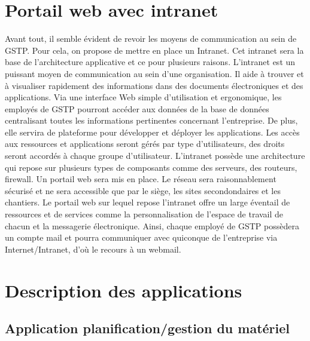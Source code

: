 \section{Portail web avec intranet}
	Avant tout, il semble évident de revoir les moyens de communication au sein de GSTP. Pour cela, on propose de mettre en place un Intranet. Cet intranet sera la base de l'architecture applicative et ce pour plusieurs raisons. L'intranet est un puissant moyen de communication au sein d'une organisation. Il aide à trouver et à visualiser rapidement des informations dans des documents électroniques et des applications. Via une interface Web simple d'utilisation et ergonomique, les employés de GSTP pourront accéder aux données de la base de données centralisant toutes les informations pertinentes concernant l'entreprise. De plus, elle servira de plateforme pour développer et déployer les applications. Les accès aux ressources et applications seront gérés par type d'utilisateurs, des droits seront accordés à chaque groupe d'utilisateur. L'intranet possède une architecture qui repose sur plusieurs types de composants comme des serveurs, des routeurs, firewall.
	Un portail web sera mis en place. Le réseau sera raisonnablement sécurisé et ne sera accessible que par le siège, les sites secondondaires et les chantiers. Le portail web sur lequel repose l'intranet offre un large éventail de ressources et de services comme la personnalisation de l'espace de travail de chacun et la messagerie électronique. Ainsi, chaque employé de GSTP possèdera un compte mail et pourra communiquer avec quiconque de l'entreprise via Internet/Intranet, d'où le recours à un webmail.

\section{Description des applications}

    \subsection{Application planification/gestion du matériel}
